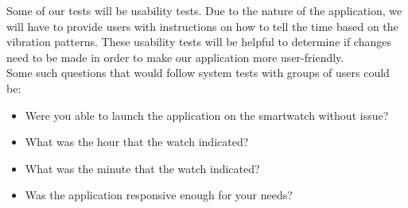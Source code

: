 Some of our tests will be usability tests. Due to the nature of the application, we will have to provide users with instructions on how to tell the time based on the vibration patterns. These usability tests will be helpful to determine if changes need to be made in order to make our application more user-friendly. \\
Some such questions that would follow system tests with groups of users could be:
\begin{itemize}
\item Were you able to launch the application on the smartwatch without issue?
\item What was the hour that the watch indicated?
\item What was the minute that the watch indicated?
\item Was the application responsive enough for your needs?
\end{itemize}

